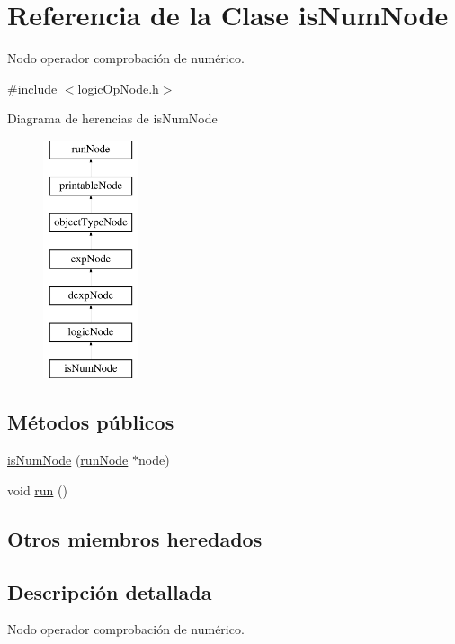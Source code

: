 \hypertarget{classisNumNode}{\section{Referencia de la Clase is\-Num\-Node}
\label{classisNumNode}
}


Nodo operador comprobación de numérico.  




{\ttfamily \#include $<$logic\-Op\-Node.\-h$>$}

Diagrama de herencias de is\-Num\-Node\begin{figure}[H]
\begin{center}
\leavevmode
\includegraphics[height=7.000000cm]{classisNumNode}
\end{center}
\end{figure}
\subsection*{Métodos públicos}
\begin{DoxyCompactItemize}
\item 
\hyperlink{classisNumNode_a513d37c30bdb83e20e5f49468ec0cd1b}{is\-Num\-Node} (\hyperlink{classrunNode}{run\-Node} $\ast$node)
\item 
void \hyperlink{classisNumNode_ac5b294788181c892a878214ffaf6b91a}{run} ()
\end{DoxyCompactItemize}
\subsection*{Otros miembros heredados}


\subsection{Descripción detallada}
Nodo operador comprobación de numérico. 

